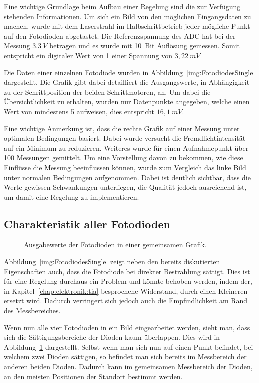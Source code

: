 Eine wichtige Grundlage beim Aufbau einer Regelung sind die zur Verfügung stehenden Informationen.
Um sich ein Bild von den möglichen Eingangsdaten zu machen, wurde mit dem Laserstrahl im Halbschrittbetrieb jeder mögliche Punkt auf den Fotodioden abgetastet.
Die Referenzspannung des ADC hat bei der Messung $3.3~V$ betragen und es wurde mit 10~Bit Auflösung gemessen.
Somit entspricht ein digitaler Wert von 1 einer Spannung von $3,22~mV$

Die Daten einer einzelnen Fotodiode wurden in Abbildung~\ref{img:FotodiodesSingle} dargestellt.
Die Grafik gibt dabei detailliert die Ausgangswerte, in Abhängigkeit zu der Schrittposition der beiden Schrittmotoren, an.
Um dabei die Übersichtlichkeit zu erhalten, wurden nur Datenpunkte angegeben, welche einen Wert von mindestens 5 aufweisen, dies entspricht $16,1~mV$.

Eine wichtige Anmerkung ist, dass die rechte Grafik auf einer Messung unter optimalen Bedingungen basiert.
Dabei wurde versucht die Fremdlichtintensität auf ein Minimum zu reduzieren.
Weiteres wurde für einen Aufnahmepunkt über 100 Messungen gemittelt.
Um eine Vorstellung davon zu bekommen, wie diese Einflüsse die Messung beeinflussen können, wurde zum Vergleich das linke Bild unter normalen Bedingungen aufgenommen.
Dabei ist deutlich sichtbar, dass die Werte gewissen Schwankungen unterliegen, die Qualität jedoch ausreichend ist, um damit eine Regelung zu implementieren.


\subsection{Charakteristik aller Fotodioden}

\begin{figure} \centering
	
	\caption{Ausgabewerte der Fotodioden in einer gemeinsamen Grafik.}
	\label{img:FotodiodesBig}
\end{figure}

Abbildung~\ref{img:FotodiodesSingle} zeigt neben den bereits diskutierten Eigenschaften auch, dass die Fotodiode bei direkter Bestrahlung sättigt.
Dies ist für eine Regelung durchaus ein Problem und könnte behoben werden, indem der, in Kapitel~\ref{chap:elektronik:tia} besprochene Widerstand, durch einen Kleineren ersetzt wird.
Dadurch verringert sich jedoch auch die Empfindlichkeit am Rand des Messbereiches.

Wenn nun alle vier Fotodioden in ein Bild eingearbeitet werden, sieht man, dass sich die Sättigungsbereiche der Dioden kaum überlappen.
Dies wird in Abbildung~\ref{img:FotodiodesBig} dargestellt.
Selbst wenn man sich nun auf einen Punkt befindet, bei welchem zwei Dioden sättigen, so befindet man sich bereits im Messbereich der anderen beiden Dioden.
Dadurch kann im gemeinsamen Messbereich der Dioden, an den meisten Positionen der Standort bestimmt werden.



